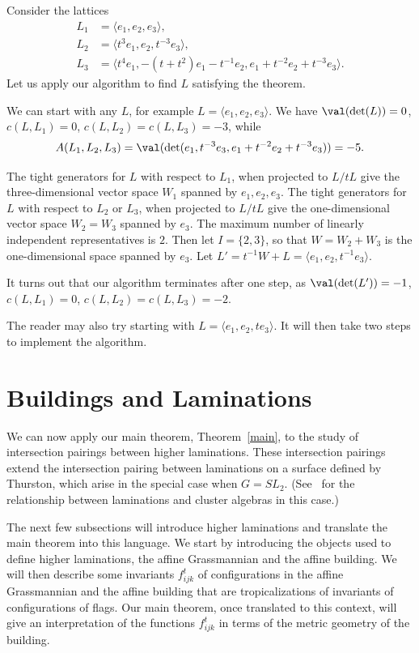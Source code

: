 \begin{example} Consider the lattices 
\begin{align*}
L_1&=\langle e_1, e_2, e_3\rangle ,
\\
L_2&=\langle t^3e_1, e_2, t^{-3}e_3\rangle ,
\\
L_3&=\langle t^4e_1, -(t+t^2)e_1-t^{-1}e_2, e_1+ t^{-2}e_2+t^{-3}e_3\rangle .
\end{align*}
Let us apply our algorithm to find $L$ satisfying the theorem.

We can start with any $L$, for example $L=\langle e_1, e_2, e_3\rangle .$ We have $\val(\det(L))=0$, $c(L,L_1)=0$, $c(L,L_2)=c(L,L_3)=-3$, while 
\[
A(L_1, L_2, L_3)=\val(\det(e_1, t^{-3}e_3, e_1+ t^{-2}e_2+t^{-3}e_3)) = -5.
\]

The tight generators for $L$ with respect to $L_1$, when projected to $L/tL$ give the three-dimensional vector space $W_1$ spanned by $e_1, e_2, e_3$. The tight generators for $L$ with respect to $L_2$ or $L_3$, when projected to $L/tL$ give the one-dimensional vector space $W_2=W_3$ spanned by $e_3$. The maximum number of linearly independent representatives is $2$. Then let $I = \{2, 3\}$, so that $W=W_2+W_3$ is the one-dimensional space spanned by $e_3$. Let $L'=t^{-1}W+L=\langle e_1, e_2, t^{-1}e_3\rangle .$

It turns out that our algorithm terminates after one step, as $\val(\det(L'))=-1$, $c(L,L_1)=0$, $c(L,L_2)=c(L,L_3)=-2$.

The reader may also try starting with $L=\langle e_1, e_2, te_3\rangle $. It will then take two steps to implement the algorithm.

\end{example}

\section{Buildings and Laminations}\label{sect5}

We can now apply our main theorem, Theorem~\ref{main}, to the study of intersection pairings between higher laminations. These intersection pairings extend the intersection pairing between laminations on a surface defined by Thurston, which arise in the special case when $G=SL_2$. (See~\cite{FST} for the relationship between laminations and cluster algebras in this case.)

The next few subsections will introduce higher laminations and translate the main theorem into this language. We start by introducing the objects used to define higher laminations, the affine Grassmannian and the affine building. We will then describe some invariants $f_{ijk}^t$ of configurations in the affine Grassmannian and the affine building that are tropicalizations of invariants of configurations of flags. Our main theorem, once translated to this context, will give an interpretation of the functions $f_{ijk}^t$ in terms of the metric geometry of the building.

